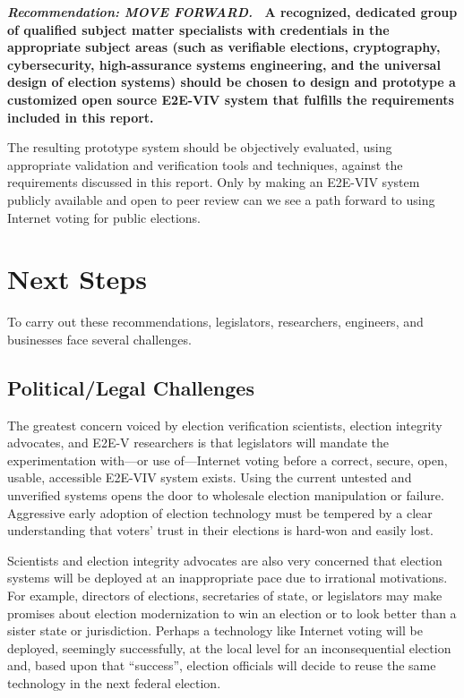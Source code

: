 \vspace{12pt} 

\textbf{\emph{Recommendation: MOVE FORWARD.} \ A recognized, dedicated
  group of qualified subject matter specialists with credentials in
  the appropriate subject areas (such as verifiable elections,
  cryptography, cybersecurity, high-assurance systems engineering, and
  the universal design of election systems) should be chosen to design
  and prototype a customized open source E2E-VIV system that fulfills
  the requirements included in this report.}

The resulting prototype system should be objectively evaluated, using
appropriate validation and verification tools and techniques, against
the requirements discussed in this report. Only by making an E2E-VIV
system publicly available and open to peer review can we see a path
forward to using Internet voting for public elections.

\section{Next Steps}
\label{sec:next-steps}

To carry out these recommendations, legislators, researchers,
engineers, and businesses face several challenges.

\subsection{Political/Legal Challenges}

The greatest concern voiced by election verification scientists,
election integrity advocates, and E2E-V researchers is that
legislators will mandate the experimentation with---or use
of---Internet voting before a correct, secure, open, usable,
accessible E2E-VIV system exists. Using the current untested and
unverified systems opens the door to wholesale election manipulation
or failure. Aggressive early adoption of election technology must be
tempered by a clear understanding that voters' trust in their
elections is hard-won and easily lost.

Scientists and election integrity advocates are also very concerned
that election systems will be deployed at an inappropriate pace due to
irrational motivations. For example, directors of elections,
secretaries of state, or legislators may make promises about election
modernization to win an election or to look better than a sister state
or jurisdiction. Perhaps a technology like Internet voting will be
deployed, seemingly successfully, at the local level for an
inconsequential election and, based upon that ``success'', election
officials will decide to reuse the same technology in the next federal
election.

